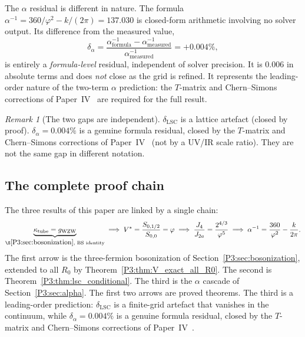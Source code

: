 \documentclass[11pt,a4paper]{article}
\theoremstyle{definition}
\theoremstyle{remark}
\newtheorem{remark}[theorem]{Remark}
\newcommand{\vp}{\varphi}
\newcommand{\Ja}{J_{2a}}
\newcommand{\Jfour}{J_{4}}
\newcommand{\aInv}{\alpha^{-1}}
\newcommand{\LSC}{\mathrm{LSC}}
\begin{document}
The $\alpha$ residual is different in nature.  The formula
$\aInv = 360/\vp^2 - k/(2\pi) = 137.030$ is closed-form arithmetic
involving no solver output.  Its difference from the measured value,
\begin{equation}
  \delta_\alpha = \frac{\aInv_{\mathrm{formula}} - \aInv_{\mathrm{measured}}}
                       {\aInv_{\mathrm{measured}}}
                = +0.004\%,
  \label{P3:eq:alpha_gap}
\end{equation}
is entirely a \emph{formula-level} residual, independent of solver
precision.  It is $0.006$ in absolute terms and does \emph{not} close
as the grid is refined.  It represents the leading-order nature of the
two-term $\alpha$ prediction: the $T$-matrix and Chern--Simons
corrections of Paper~IV~\cite{Paper4} are required for the full result.

\begin{remark}[The two gaps are independent]
\label{P3:rem:two_gaps_independent}
$\delta_{\LSC}$ is a lattice artefact (closed by proof).
$\delta_\alpha = 0.004\%$ is a genuine formula residual, closed by the
$T$-matrix and Chern--Simons corrections of Paper~IV~\cite{Paper4} (not
by a UV/IR scale ratio).  They are not the same gap in different notation.
\end{remark}

\subsection{The complete proof chain}

The three results of this paper are linked by a single chain:
\begin{equation}
  \underbrace{\kappa_{\mathrm{tube}} = g_{\mathrm{WZW}}}_{\S\ref{P3:sec:bosonization}\text{, BS identity}}
  \;\Longrightarrow\;
  V^* = \frac{S_{0,1/2}}{S_{0,0}} = \vp
  \;\Longrightarrow\;
  \frac{\Jfour}{\Ja} = \frac{2^{4/3}}{\vp^5}
  \;\Longrightarrow\;
  \aInv = \frac{360}{\vp^2} - \frac{k}{2\pi}.
  \label{P3:eq:chain_full}
\end{equation}
The first arrow is the three-fermion bosonization of Section~\ref{P3:sec:bosonization},
extended to all $R_0$ by Theorem~\ref{P3:thm:V_exact_all_R0}.
The second is Theorem~\ref{P3:thm:lsc_conditional}.
The third is the $\alpha$ cascade of Section~\ref{P3:sec:alpha}.
The first two arrows are proved theorems.
The third is a leading-order prediction: $\delta_{\LSC}$ is a finite-grid
artefact that vanishes in the continuum, while $\delta_\alpha = 0.004\%$
is a genuine formula residual, closed by the $T$-matrix and
Chern--Simons corrections of Paper~IV~\cite{Paper4}.
\end{document}

